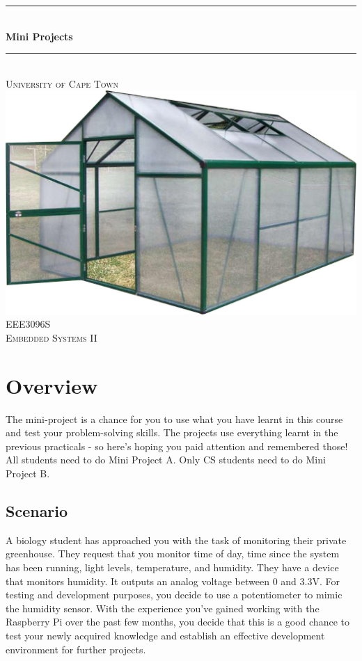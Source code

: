\begin{center}
    	\rule{\linewidth}{0.2 mm} \\[0.4 cm]
	{ \huge \bfseries Mini Projects}\\
	\rule{\linewidth}{0.2 mm} \\[1.5 cm]
	\textsc{\LARGE University of Cape Town}\\[2.0 cm]	%
	\includegraphics[scale = 0.5]{Figures/Greenhouse.jpg}\\[1 cm]	%
	\textsc{\Large EEE3096S}\\[0.5 cm]				%
	\textsc{\large Embedded Systems II}\\[0.5 cm]				%
\end{center}

\section{Overview}
The mini-project is a chance for you to use what you have learnt in this course and test your problem-solving skills. The projects use everything learnt in the previous practicals - so here's hoping you paid attention and remembered those! All students need to do Mini Project A. Only CS students need to do Mini Project B.

\subsection{Scenario}
A biology student has approached you with the task of monitoring their private greenhouse. They request that you monitor time of day, time since the system has been running, light levels, temperature, and humidity. They have a device that monitors humidity. It outputs an analog voltage between 0 and 3.3V. For testing and development purposes, you decide to use a potentiometer to mimic the humidity sensor. With the experience you've gained working with the Raspberry Pi over the past few months, you decide that this is a good chance to test your newly acquired knowledge and establish an effective development environment for further projects.

